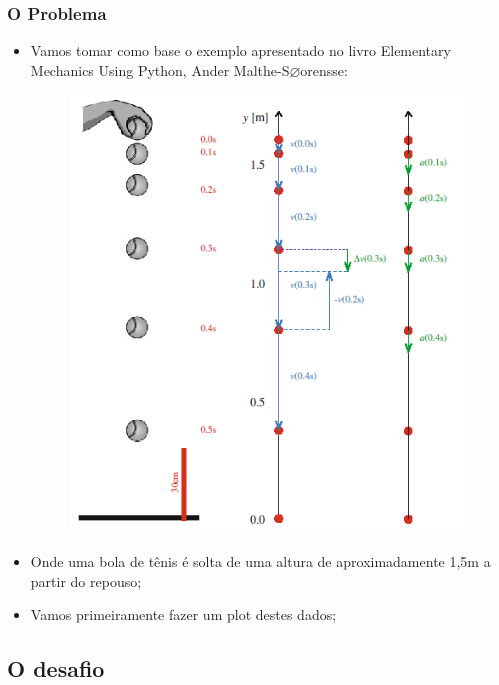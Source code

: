 \documentclass[notes=show]{beamer}
\begin{document}
\begin{frame}%

\frametitle{O Problema}

\begin{itemize}
\item Vamos tomar como base o exemplo apresentado no livro Elementary
Mechanics Using Python, Ander Malthe-S$\varnothing$orensse:
\begin{figure}
	\includegraphics[scale=.35]{fig4-5.png}
\end{figure}

\item Onde uma bola de t\^{e}nis \'{e} solta de uma altura de
aproximadamente 1,5m a partir do repouso;

\item Vamos primeiramente fazer um plot destes dados;
\end{itemize}

\end{frame}%

\subsection{O desafio}
\end{document}

